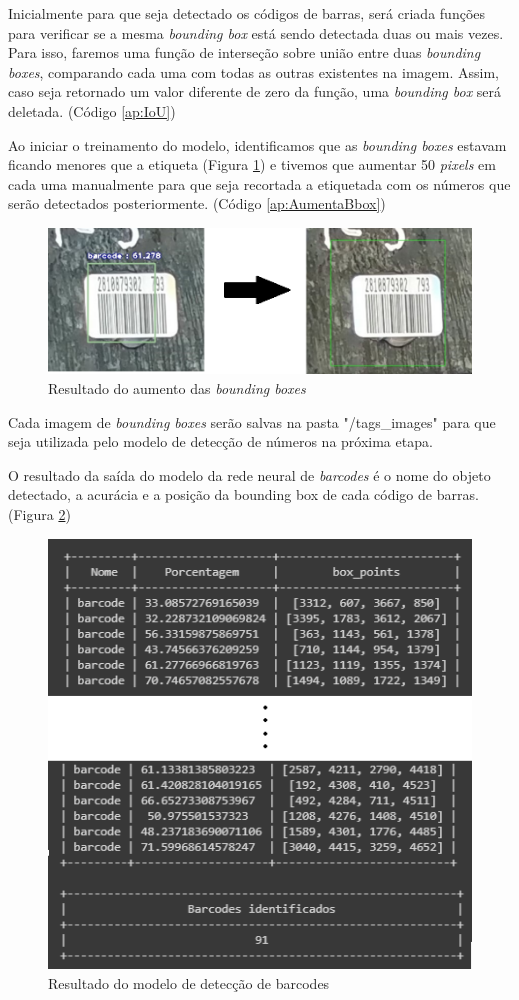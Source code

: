 Inicialmente para que seja detectado os códigos de barras, será criada funções para verificar se a mesma \textit{bounding box} está sendo detectada duas ou mais vezes. Para isso, faremos uma função de interseção sobre união entre duas \textit{bounding boxes}, comparando cada uma com todas as outras existentes na imagem. Assim, caso seja retornado um valor diferente de zero da função, uma \textit{bounding box} será deletada. (Código \ref{ap:IoU})

Ao iniciar o treinamento do modelo, identificamos que as \textit{bounding boxes} estavam ficando menores que a etiqueta (Figura \ref{fig:bboxNew}) e tivemos que aumentar 50 \textit{pixels} em cada uma manualmente para que seja recortada a etiquetada com os números que serão detectados posteriormente. (Código \ref{ap:AumentaBbox})

\begin{figure}[H]
	\centering
	\includegraphics[width=1\linewidth]{figuras/MachineLearning/bboxNew.png}
	\caption{ Resultado do aumento das \textit{bounding boxes}}
	\label{fig:bboxNew}
\end{figure}

Cada imagem de \textit{bounding boxes} serão salvas na pasta "/tags\_images" para que seja utilizada pelo modelo de detecção de números na próxima etapa.

O resultado da saída do modelo da rede neural de \textit{barcodes} é o nome do objeto detectado, a acurácia e a posição da bounding box de cada código de barras. (Figura \ref{fig:indentBarcodes})

\begin{figure}[H]
	\centering
	\includegraphics[width=0.6\linewidth]{figuras/MachineLearning/indentBarcodes.png}
	\caption{ Resultado do modelo de detecção de barcodes}
	\label{fig:indentBarcodes}
\end{figure}


